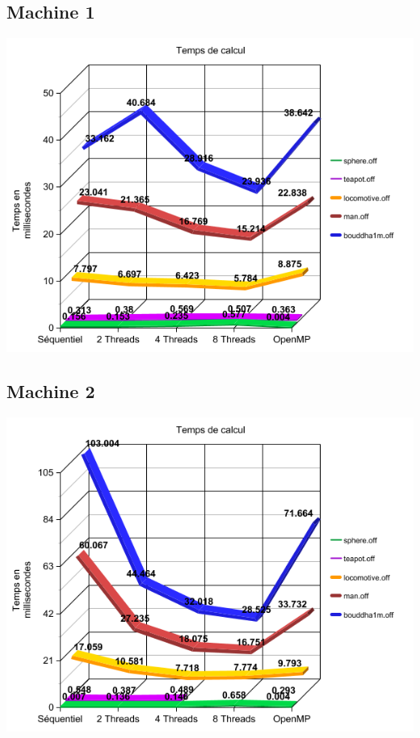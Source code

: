 \documentclass[a4paper]{article}
\begin{document}
	\subsection{Machine 1}
	\begin{center}
		\includegraphics[scale = 0.5]{graph_execTime_machine1.png}
	\end{center}

	\subsection{Machine 2}
	\begin{center}
		\includegraphics[scale = 0.5]{graph_execTime_machine2.png}
	\end{center}
\end{document}
